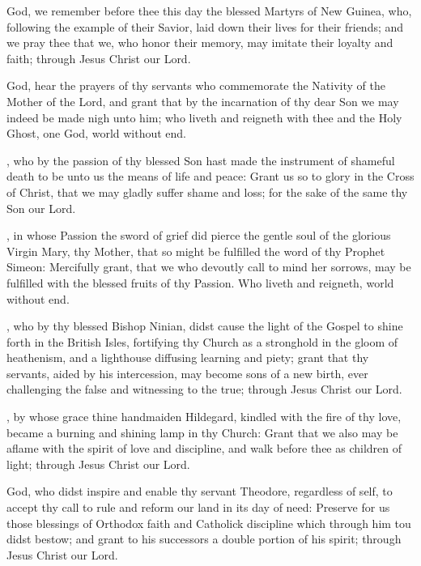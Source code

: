  God, we remember before thee this day the blessed Martyrs of New Guinea, who, following the example of their Savior, laid down their lives for their friends; and we pray thee that we, who honor their memory, may imitate their loyalty and faith; through Jesus Christ our Lord.

 God, hear the prayers of thy servants who commemorate the Nativity of the Mother of the Lord, and grant that by the incarnation of thy dear Son we may indeed be made nigh unto him; who liveth and reigneth with thee and the Holy Ghost, one God, world without end.

, who by the passion of thy blessed Son hast made the instrument of shameful death to be unto us the means of life and peace: Grant us so to glory in the Cross of Christ, that we may gladly suffer shame and loss; for the sake of the same thy Son our Lord.

, in whose Passion the sword of grief did pierce the gentle soul of the glorious Virgin Mary, thy Mother, that so might be fulfilled the word of thy Prophet Simeon: Mercifully grant, that we who devoutly call to mind her sorrows, may be fulfilled with the blessed fruits of thy Passion. Who liveth and reigneth, world without end.

, who by thy blessed Bishop Ninian, didst cause the light of the Gospel to shine forth in the British Isles, fortifying thy Church as a stronghold in the gloom of heathenism, and a lighthouse diffusing learning and piety; grant that thy servants, aided by his intercession, may become sons of a new birth, ever challenging the false and witnessing to the true; through Jesus Christ our Lord.

, by whose grace thine handmaiden Hildegard, kindled with the fire of thy love, became a burning and shining lamp in thy Church: Grant that we also may be aflame with the spirit of love and discipline, and walk before thee as children of light; through Jesus Christ our Lord.

 God, who didst inspire and enable thy servant Theodore, regardless of self, to accept thy call to rule and reform our land in its day of need: Preserve for us those blessings of Orthodox faith and Catholick discipline which through him tou didst bestow; and grant to his successors a double portion of his spirit; through Jesus Christ our Lord.

